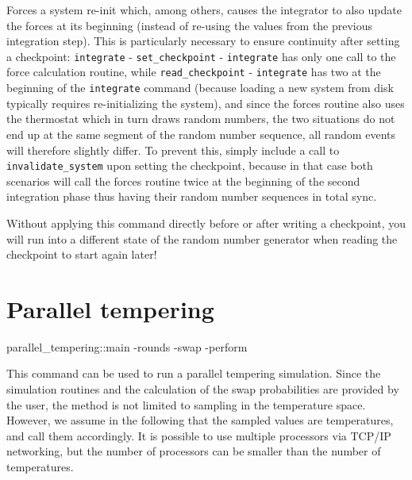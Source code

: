 Forces a system re-init which, among others, causes the integrator to
also update the forces at its beginning (instead of re-using the
values from the previous integration step).  This is particularly
necessary to ensure continuity after setting a checkpoint:
\texttt{integrate} - \texttt{set_checkpoint} - \texttt{integrate} has
only one call to the force calculation routine, while
\texttt{read_checkpoint} - \texttt{integrate} has two at the beginning
of the \texttt{integrate} command (because loading a new system from
disk typically requires re-initializing the system), and since the
forces routine also uses the thermostat which in turn draws random
numbers, the two situations do not end up at the same segment of the
random number sequence, all random events will therefore slightly
differ.  To prevent this, simply include a call to
\texttt{invalidate_system} upon setting the checkpoint, because in
that case both scenarios will call the forces routine twice at the
beginning of the second integration phase thus having their random
number sequences in total sync.

Without applying this command directly before or after writing a
checkpoint, you will run into a different state of the random number
generator when reading the checkpoint to start again later!

\section{Parallel tempering}
\begin{essyntax}
  parallel_tempering::main
  -rounds 
  -swap 
  -perform 
\end{essyntax}

This command can be used to run a parallel tempering simulation. Since the simulation routines and
the calculation of the swap probabilities are provided by the user, the method is not limited to
sampling in the temperature space. However, we assume in the following that the sampled values are
temperatures, and call them accordingly. It is possible to use multiple processors via TCP/IP
networking, but the number of processors can be smaller than the number of temperatures.

